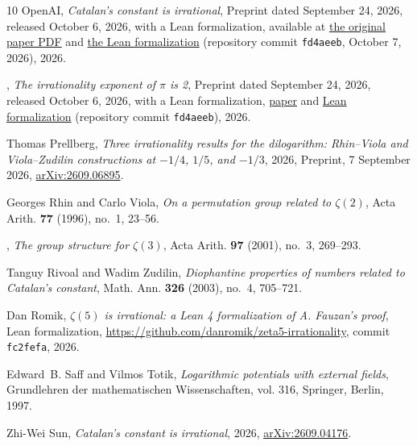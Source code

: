 \documentclass[11pt]{amsart}
\theoremstyle{definition}
\theoremstyle{remark}
\numberwithin{equation}{section}
\begin{document}
\begin{thebibliography}{10}
{OpenAI}, \emph{Catalan's constant is irrational}, Preprint dated September 24,
  2026, released October 6, 2026, with a Lean formalization, available at
  \href{https://github.com/openai/math/blob/fd4aeeb2ee4fc729c18d98444fed42fd0529eeeb/preprints/Catalans-constant-is-irrational-September-24-2026/paper.pdf}{the
  original paper PDF} and
  \href{https://github.com/openai/math/tree/fd4aeeb2ee4fc729c18d98444fed42fd0529eeeb/lean/OAI/NumberTheory/Catalan}{the
  Lean formalization} (repository commit \texttt{fd4aeeb}, October 7, 2026),
  2026.

\bysame, \emph{The irrationality exponent of {$\pi$} is 2}, Preprint dated
  September 24, 2026, released October 6, 2026, with a Lean formalization,
  \href{https://github.com/openai/math/tree/fd4aeeb2ee4fc729c18d98444fed42fd0529eeeb/preprints/The-irrationality-exponent-of-pi-is-2-September-24-2026}{paper}
  and
  \href{https://github.com/openai/math/tree/fd4aeeb2ee4fc729c18d98444fed42fd0529eeeb/lean/OAI/NumberTheory/PiExponent}{Lean
  formalization} (repository commit \texttt{fd4aeeb}), 2026.

Thomas Prellberg, \emph{Three irrationality results for the dilogarithm:
  {R}hin--{V}iola and {V}iola--{Z}udilin constructions at {$-1/4$}, {$1/5$},
  and {$-1/3$}}, 2026, Preprint, 7 September 2026,
  \href{https://arxiv.org/abs/2609.06895}{arXiv:2609.06895}.

Georges Rhin and Carlo Viola, \emph{On a permutation group related to
  {$\zeta(2)$}}, Acta Arith. \textbf{77} (1996), no.~1, 23--56.

\bysame, \emph{The group structure for {$\zeta(3)$}}, Acta Arith. \textbf{97}
  (2001), no.~3, 269--293.

Tanguy Rivoal and Wadim Zudilin, \emph{Diophantine properties of numbers
  related to {C}atalan's constant}, Math. Ann. \textbf{326} (2003), no.~4,
  705--721.

Dan Romik, \emph{{$\zeta(5)$} is irrational: a {L}ean 4 formalization of {A}.
  {F}auzan's proof}, Lean formalization,
  \url{https://github.com/danromik/zeta5-irrationality}, commit
  \texttt{fc2fefa}, 2026.

Edward~B. Saff and Vilmos Totik, \emph{Logarithmic potentials with external
  fields}, Grundlehren der mathematischen Wissenschaften, vol. 316, Springer,
  Berlin, 1997.

Zhi-Wei Sun, \emph{Catalan's constant is irrational}, 2026,
  \href{https://arxiv.org/abs/2609.04176}{arXiv:2609.04176}.


\end{thebibliography}
\end{document}
